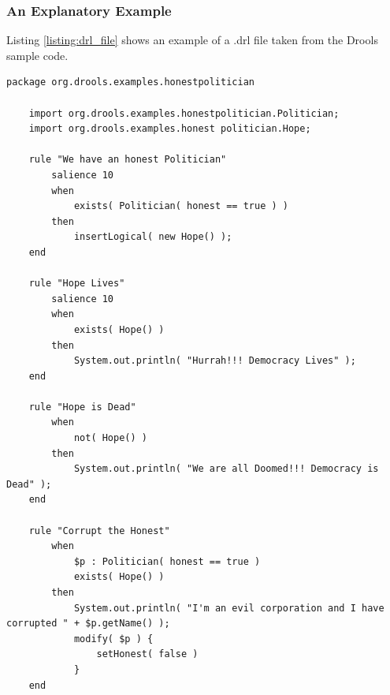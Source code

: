 \subsubsection{An Explanatory Example}
Listing \ref{listing:drl_file} shows an example of a .drl file taken from the Drools sample code.

\noindent\begin{minipage}{\textwidth}
    \begin{lstlisting}[language={[drl]Drools}, caption=Example Drools file, captionpos=b, label=listing:drl_file]
    package org.drools.examples.honestpolitician

    import org.drools.examples.honestpolitician.Politician;
    import org.drools.examples.honest politician.Hope;
    
    rule "We have an honest Politician"
        salience 10
        when
            exists( Politician( honest == true ) )
        then
            insertLogical( new Hope() );
    end
    
    rule "Hope Lives"
        salience 10
        when
            exists( Hope() )
        then
            System.out.println( "Hurrah!!! Democracy Lives" );
    end
    
    rule "Hope is Dead"
        when
            not( Hope() )
        then
            System.out.println( "We are all Doomed!!! Democracy is Dead" );
    end
    
    rule "Corrupt the Honest"
        when
            $p : Politician( honest == true )   
            exists( Hope() )
        then
            System.out.println( "I'm an evil corporation and I have corrupted " + $p.getName() );
            modify( $p ) { 
                setHonest( false ) 
            }
    end
    \end{lstlisting}
\end{minipage}

